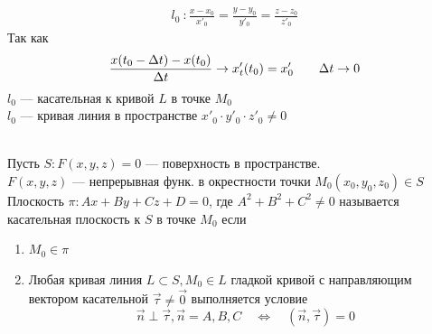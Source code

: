 		\begin{gather*}
			l_0 \: : \frac{x - x_0}{x'_0} = \frac{y - y_0}{y'_0} = \frac{z - z_0}{z'_0}
        \end{gather*}
        Так как 
        \begin{equation*}
            \frac{x(t_0 - \Delta t) - x(t_0)}{\Delta t} \to x'_t(t_0) = x'_0 \qquad \Delta t \to 0 \\
		\end{equation*}
		$l_0$ --- касательная к кривой $L$ в точке $M_0$ \\
		$l_0$ --- кривая линия в пространстве ${x'_0} \cdot {y'_0} \cdot {z'_0} \neq 0$
		
		
		\begin{Def}~\\
			Пусть $S : F(x, y, z) = 0$ --- поверхность в пространстве.\\
            $F(x, y, z)$ --- непрерывная функ. в окрестности точки $M_0(x_0, y_0, z_0) \in S$\\
			Плоскость $\pi : Ax + By + Cz + D = 0$, где $A^2 + B^2 + C^2 \neq 0$ называется касательная плоскость к $S$ в точке $M_0$ если
			\begin{enumerate}
				\item $M_0 \in \pi$ 
				\item Любая кривая линия $L \subset S, M_0 \in L$ гладкой кривой с направляющим вектором касательной $\vec{\tau} \neq \vec{0}$ выполняется условие 
                \[
                    \vec{n} \perp \vec{\tau}, \vec{n} = {A, B, C} \quad \Leftrightarrow \quad (\vec{n}, \vec{\tau}) = 0
                \]
			\end{enumerate}
			
         	\begin{figure}[bh]
            \noindent{}
            \end{figure}
						
		\end{Def}
	
